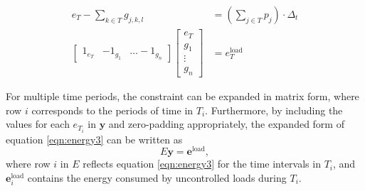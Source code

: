 \begin{equation}\label{eqn:energy3}
	\begin{aligned}
	e_T -\sum_{k\in T}g_{j,k,l} &= \left ( \sum_{j\in T}p_j \right ) \cdot \Delta_t \\
		\begin{bmatrix} 1_{e_T} & -1_{g_1} & \hdots -1_{g_n} \end{bmatrix} \begin{bmatrix}e_T \\ g_1 \\ \vdots \\ g_n \end{bmatrix} &= e^\text{load}_T
	\end{aligned}
\end{equation}
\par For multiple time periods, the constraint can be expanded in matrix form, where row $i$ corresponds to the periods of time in $T_i$. Furthermore, by including the values for each $e_{T_i}$ in $\mathbf{y}$ and zero-padding appropriately, the expanded form of equation \ref{eqn:energy3} can be written as  
\begin{equation}
	E\mathbf{y} = \mathbf{e}^\text{load},
\end{equation}
where row $i$ in $E$ reflects equation \ref{eqn:energy3} for the time intervals in $T_i$, and $\mathbf{e}^\text{load}_i$ contains the energy consumed by uncontrolled loads during $T_i$.

